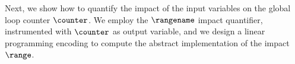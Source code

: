 
Next, we show how to quantify the impact of the input variables on the global loop counter $\counter$.
We employ the $\rangename$ impact quantifier, instrumented with $\counter$ as output variable, and we design a linear programming encoding to compute the abstract implementation of the impact $\range$.

